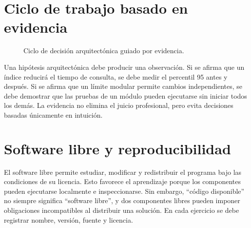 \section{Ciclo de trabajo basado en evidencia}
\begin{figure}[H]
\centering
{}
\caption{Ciclo de decisión arquitectónica guiado por evidencia.}
\label{fig:ciclo-evidencia}
\end{figure}

Una hipótesis arquitectónica debe producir una observación. Si se afirma que un índice reducirá el tiempo de consulta, se debe medir el percentil 95 antes y después. Si se afirma que un límite modular permite cambios independientes, se debe demostrar que las pruebas de un módulo pueden ejecutarse sin iniciar todos los demás. La evidencia no elimina el juicio profesional, pero evita decisiones basadas únicamente en intuición.

\section{Software libre y reproducibilidad}
El software libre permite estudiar, modificar y redistribuir el programa bajo las condiciones de su licencia. Esto favorece el aprendizaje porque los componentes pueden ejecutarse localmente e inspeccionarse. Sin embargo, ``código disponible'' no siempre significa ``software libre'', y dos componentes libres pueden imponer obligaciones incompatibles al distribuir una solución. En cada ejercicio se debe registrar nombre, versión, fuente y licencia.

